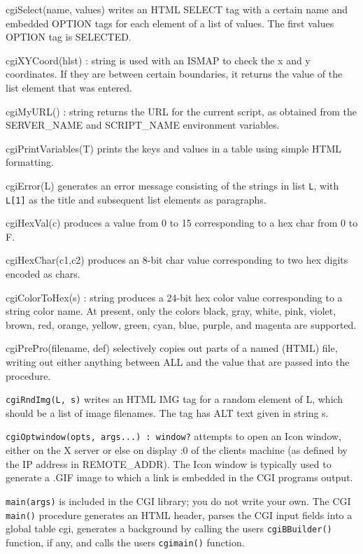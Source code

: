 \textsf{cgiSelect(name, values)} writes an HTML SELECT tag with a
certain name and embedded OPTION tags for each element of a list of
values. The first value{\textquotesingle}s OPTION tag is SELECTED. 

\textsf{cgiXYCoord(hlst) : string} is used with an ISMAP to check the x
and y coordinates. If they are between certain boundaries, it returns
the value of the list element that was entered. 

\textsf{cgiMyURL() : string} returns the URL for the current script, as
obtained from the SERVER\_NAME and SCRIPT\_NAME environment variables. 

\textsf{cgiPrintVariables(T)} prints the keys and values in a table
using simple HTML formatting. 

\textsf{cgiError(L)} generates an error message consisting of the
strings in list \texttt{L}, with \texttt{L[1]} as the title and
subsequent list elements as paragraphs.

\textsf{cgiHexVal(c)} produces a value from 0 to 15 corresponding to a
hex char from 0 to F. 

\textsf{cgiHexChar(c1,c2)} produces an 8-bit char value corresponding to
two hex digits encoded as chars. 

\textsf{cgiColorToHex(s) : string} produces a 24-bit hex color value
corresponding to a string color name. At present, only the colors
black, gray, white, pink, violet, brown, red, orange, yellow, green,
cyan, blue, purple, and magenta are supported. 

\textsf{cgiPrePro(filename, def)} selectively copies out parts of a
named (HTML) file, writing out either anything between ALL and the
value that are passed into the procedure. 

\texttt{cgiRndImg(L, s)} writes an HTML IMG tag for a random element of
L, which should be a list of image filenames. The tag has ALT text
given in string s. 

\texttt{cgiOptwindow(opts, args...) : window?} attempts to open an Icon
window, either on the X server or else on display :0 of the
client{\textquotesingle}s machine (as defined by the IP address in
REMOTE\_ADDR). The Icon window is typically used to generate a .GIF
image to which a link is embedded in the CGI
program{\textquotesingle}s output. 

\texttt{main(args)} is included in the CGI library; you do not write
your own. The CGI \texttt{main()} procedure generates an HTML header,
parses the CGI input fields into a global table cgi, generates a
background by calling the user{\textquotesingle}s
\texttt{cgiBBuilder()} function, if any, and calls the
user{\textquotesingle}s \texttt{cgimain()} function. 

